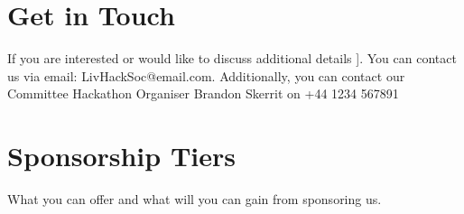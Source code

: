 \documentclass{report}
\begin{document}
    
    \section *{Get in Touch}
    If you are interested or would like to discuss additional details ]. You can contact us via email: \textcolor{MyLinkBlue}{LivHackSoc@email.com}. Additionally, you
    can contact our Committee Hackathon Organiser Brandon Skerrit on \textcolor{MyLinkBlue}{+44 1234 567891}

    \section *{Sponsorship Tiers}
    What you can offer and what will you can gain from sponsoring us.
    
    
\end{document}
